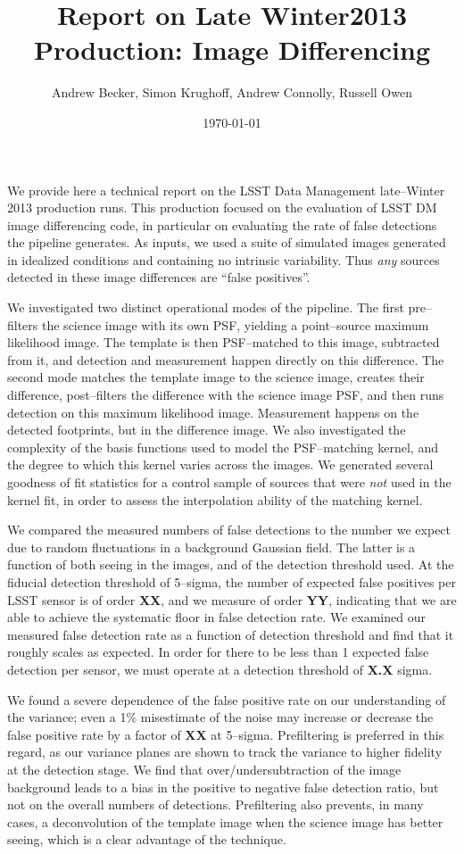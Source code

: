 \documentclass[prd, nofootinbib, floatfix, 11pt,tightenlines,times]{article}
\author{Andrew Becker, Simon Krughoff, Andrew Connolly, Russell Owen\vspace{-2ex}}
\title{Report on Late Winter2013 Production: Image Differencing\vspace{-2ex}}
\date{\vspace{-2ex}\today}
\begin{document}
\maketitle
\vspace{-2ex}
We provide here a technical report on the LSST Data Management
late--Winter 2013 production runs.  This production focused on the
evaluation of LSST DM image differencing code, in particular on
evaluating the rate of false detections the pipeline generates.  As
inputs, we used a suite of simulated images generated in idealized
conditions and containing no intrinsic variability.  Thus {\it any}
sources detected in these image differences are ``false positives''.

We investigated two distinct operational modes of the pipeline.  The
first pre--filters the science image with its own PSF, yielding a
point--source maximum likelihood image.  The template is then
PSF--matched to this image, subtracted from it, and detection and
measurement happen directly on this difference.  The second mode
matches the template image to the science image, creates their
difference, post--filters the difference with the science image PSF,
and then runs detection on this maximum likelihood image.  Measurement
happens on the detected footprints, but in the difference image.  We
also investigated the complexity of the basis functions used to model
the PSF--matching kernel, and the degree to which this kernel varies
across the images.  We generated several goodness of fit statistics
for a control sample of sources that were {\it not} used in the kernel
fit, in order to assess the interpolation ability of the matching
kernel.

We compared the measured numbers of false detections to the number we
expect due to random fluctuations in a background Gaussian field.  The
latter is a function of both seeing in the images, and of the
detection threshold used.  At the fiducial detection threshold of
5--sigma, the number of expected false positives per LSST sensor is of
order {\bf XX}, and we measure of order {\bf YY}, indicating that we
are able to achieve the systematic floor in false detection rate.  We
examined our measured false detection rate as a function of detection
threshold and find that it roughly scales as expected.  In order for
there to be less than 1 expected false detection per sensor, we must
operate at a detection threshold of {\bf X.X} sigma.

We found a severe dependence of the false positive rate on our
understanding of the variance; even a 1\% misestimate of the noise may
increase or decrease the false positive rate by a factor of {\bf XX}
at 5--sigma.  Prefiltering is preferred in this regard, as our
variance planes are shown to track the variance to higher fidelity at
the detection stage.  We find that over/undersubtraction of the image
background leads to a bias in the positive to negative false detection
ratio, but not on the overall numbers of detections.  Prefiltering
also prevents, in many cases, a deconvolution of the template image
when the science image has better seeing, which is a clear advantage
of the technique.
\end{document}

